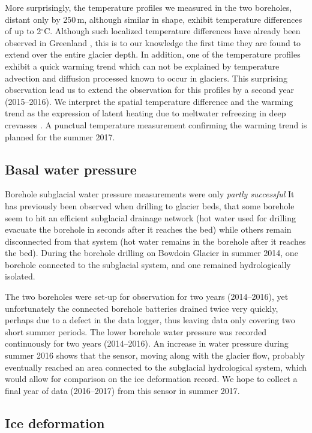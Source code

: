\documentclass{article}
\newcommand{\unit}[1]{\ensuremath{\mathrm{#1}}}
\newcommand{\degree}[0]{\ensuremath{^{\circ}}}
\newcommand{\degC}[0]{\unit{{\degree}C}}
\begin{document}
More surprisingly, the temperature profiles we measured in the two boreholes,
distant only by 250\,m, although similar in shape, exhibit temperature
differences of up to 2\degC. Although such localized temperature differences
have already been observed in Greenland \citep{Luthi.etal.20xx}, this is to our
knowledge the first time they are found to extend over the entire glacier
depth. In addition, one of the temperature profiles exhibit a quick warming
trend which can not be explained by temperature advection and diffusion
processed known to occur in glaciers. This surprising observation lead us to
extend the observation for this profiles by a second year (2015--2016). We
interpret the spatial temperature difference and the warming trend as the
expression of latent heating due to meltwater refreezing in deep crevasses
\citep{Seguinot.etal.inprepa}. A punctual temperature measurement confirming
the warming trend is planned for the summer 2017.


\subsection{Basal water pressure}

Borehole subglacial water pressure measurements were only \emph{partly
successful} It has previously been observed when drilling to glacier beds, that
some borehole seem to hit an efficient subglacial drainage network (hot water
used for drilling evacuate the borehole in seconds after it reaches the bed)
while others remain disconnected from that system (hot water remains in the
borehole after it reaches the bed). During the borehole drilling on Bowdoin
Glacier in summer 2014, one borehole connected to the subglacial system, and
one remained hydrologically isolated.

The two boreholes were set-up for observation for two years (2014--2016), yet
unfortunately the connected borehole batteries drained twice very quickly,
perhaps due to a defect in the data logger, thus leaving data only covering two
short summer periods. The lower borehole water pressure was recorded
continuously for two years (2014--2016). An increase in water pressure during
summer 2016 shows that the sensor, moving along with the glacier flow, probably
eventually reached an area connected to the subglacial hydrological system,
which would allow for comparison on the ice deformation record. We hope to
collect a final year of data (2016--2017) from this sensor in summer 2017.


\subsection{Ice deformation}
\end{document}

